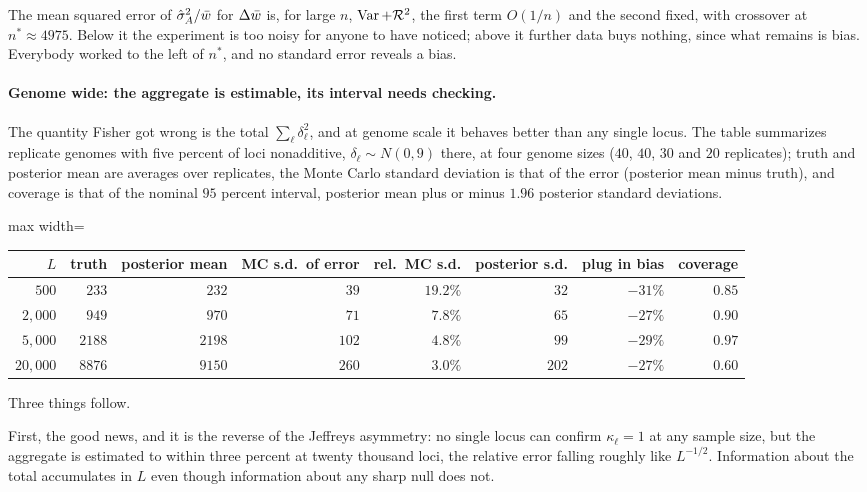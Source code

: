 The mean squared error of $\hat\sigma^2_A/\bar{w}$ for $\Delta\bar{w}$ is, for large $n$, $\operatorname{Var}+\mathcal{R}^2$, the first term
$O(1/n)$ and the second fixed, with crossover at $n^\ast\approx4975$. Below it the experiment is
too noisy for anyone to have noticed; above it further data buys nothing, since what remains is
bias. Everybody worked to the left of $n^\ast$, and no standard error reveals a bias.

\paragraph{Genome wide: the aggregate is estimable, its interval needs checking.} The
quantity Fisher got wrong is the total $\sum_\ell\delta^2_\ell$, and at genome scale it behaves
better than any single locus. The table summarizes replicate genomes with five percent of loci
nonadditive, $\delta_\ell\sim N(0,9)$ there, at four genome sizes ($40$, $40$, $30$ and $20$
replicates); truth and posterior mean are averages over replicates, the Monte Carlo standard
deviation is that of the error (posterior mean minus truth), and coverage is that of the nominal
$95$ percent interval, posterior mean plus or minus $1.96$ posterior standard deviations.

\begin{center}
\begin{adjustbox}{max width=\textwidth}
\begin{tabular}{rrrrrrrr}
\toprule
$L$ & truth & posterior mean & MC s.d.\ of error & rel.\ MC s.d. & posterior s.d. & plug in bias & coverage \\
\midrule
$500$      & $233$  & $232$  & $39$  & $19.2\%$ & $32$  & $-31\%$ & $0.85$ \\
$2{,}000$  & $949$  & $970$  & $71$  & $7.8\%$  & $65$  & $-27\%$ & $0.90$ \\
$5{,}000$  & $2188$ & $2198$ & $102$ & $4.8\%$  & $99$  & $-29\%$ & $0.97$ \\
$20{,}000$ & $8876$ & $9150$ & $260$ & $3.0\%$  & $202$ & $-27\%$ & $0.60$ \\
\bottomrule
\end{tabular}
\end{adjustbox}
\end{center}

Three things follow.

First, the good news, and it is the reverse of the Jeffreys asymmetry: no single locus can confirm
$\kappa_\ell=1$ at any sample size, but the aggregate is estimated to within three percent at twenty
thousand loci, the relative error falling roughly like $L^{-1/2}$. Information about the total
accumulates in $L$ even though information about any sharp null does not.

